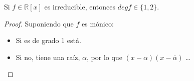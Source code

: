 \begin{coro}
    Si $f\in \mathbb{R}[x]$ es irreducible, entonces $degf \in \{1,2\}$.
    \begin{proof}
        Suponiendo que $f$ es mónico:
        \begin{itemize}
            \item Si es de grado 1 está.
            \item Si no, tiene una raíz, $\alpha$, por lo que $(x-\alpha)(x-\overline{\alpha})$ \ldots %
        \end{itemize}
    \end{proof}
\end{coro}

